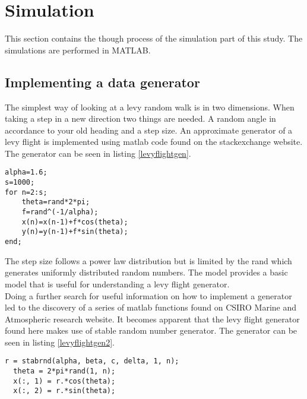\section{Simulation}
This section contains the though process of the simulation part of this study. The simulations are performed in MATLAB.

\subsection{Implementing a data generator}
The simplest way of looking at a levy random walk is in two dimensions. When taking a step in a new direction two things are needed. A random angle in accordance to your old heading and a step size. An approximate generator of a levy flight is implemented using matlab code found on the stackexchange website\cite{firstlevy}. The generator can be seen in listing \ref{levyflightgen}.
\begin{lstlisting}[caption={Approximate levy flight generator},label=levyflightgen]
alpha=1.6;
s=1000;
for n=2:s;
    theta=rand*2*pi;
    f=rand^(-1/alpha);
    x(n)=x(n-1)+f*cos(theta);
    y(n)=y(n-1)+f*sin(theta);
end;
\end{lstlisting}
The step size follows a power law distribution but is limited by the rand which generates uniformly distributed random numbers. The model provides a basic model that is useful for understanding a levy flight generator.\\
Doing a further search for useful information on how to implement a generator led to the discovery of a series of matlab functions found on CSIRO Marine and Atmospheric research website\cite{betterlevy}. It becomes apparent that the levy flight generator found here makes use of stable random number generator\cite{stabrnd}. The generator can be seen in listing \ref{levyflightgen2}.  
\begin{lstlisting}[caption={Levy flight generator using a stable random number generator},label=levyflightgen2]
  r = stabrnd(alpha, beta, c, delta, 1, n);
  theta = 2*pi*rand(1, n);
  x(:, 1) = r.*cos(theta);
  x(:, 2) = r.*sin(theta);
\end{lstlisting}

